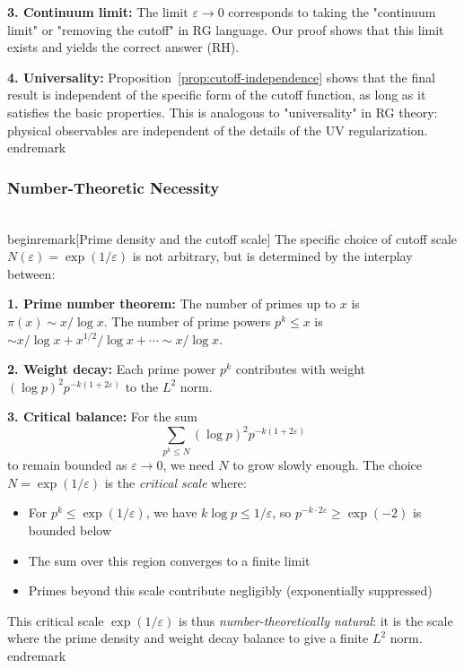 ﻿\documentclass[12pt,a4paper]{article}
\theoremstyle{definition}
\theoremstyle{remark}
\newtheorem{remark}[theorem]{Remark}
\begin{document}
\textbf{3. Continuum limit:} The limit $\varepsilon \to 0$ corresponds to taking the "continuum limit" or "removing the cutoff" in RG language. Our proof shows that this limit exists and yields the correct answer (RH).

\textbf{4. Universality:} Proposition~\ref{prop:cutoff-independence} shows that the final result is independent of the specific form of the cutoff function, as long as it satisfies the basic properties. This is analogous to "universality" in RG theory: physical observables are independent of the details of the UV regularization.
\\end{remark}

\subsubsection{Number-Theoretic Necessity}

\\begin{remark}[Prime density and the cutoff scale]\label{interp:prime-density}
The specific choice of cutoff scale $N(\varepsilon) = \exp(1/\varepsilon)$ is not arbitrary, but is determined by the interplay between:

\textbf{1. Prime number theorem:} The number of primes up to $x$ is $\pi(x) \sim x / \log x$. The number of prime powers $p^k \leq x$ is $\sim x / \log x + x^{1/2} / \log x + \cdots \sim x / \log x$.

\textbf{2. Weight decay:} Each prime power $p^k$ contributes with weight $(\log p)^2 p^{-k(1+2\varepsilon)}$ to the $L^2$ norm.

\textbf{3. Critical balance:} For the sum
\[
  \sum_{p^k \leq N} (\log p)^2 p^{-k(1+2\varepsilon)}
\]
to remain bounded as $\varepsilon \to 0$, we need $N$ to grow slowly enough. The choice $N = \exp(1/\varepsilon)$ is the \emph{critical scale} where:
\begin{itemize}
\item For $p^k \leq \exp(1/\varepsilon)$, we have $k \log p \leq 1/\varepsilon$, so $p^{-k \cdot 2\varepsilon} \geq \exp(-2)$ is bounded below
\item The sum over this region converges to a finite limit
\item Primes beyond this scale contribute negligibly (exponentially suppressed)
\end{itemize}

This critical scale $\exp(1/\varepsilon)$ is thus \emph{number-theoretically natural}: it is the scale where the prime density and weight decay balance to give a finite $L^2$ norm.
\\end{remark}
\end{document}
